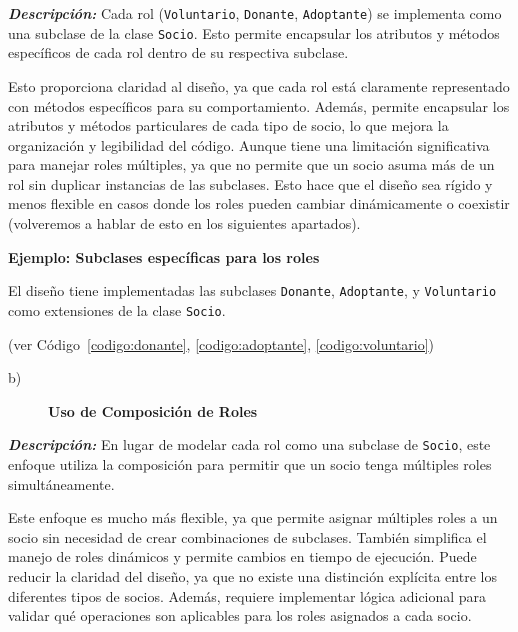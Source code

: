 \textit{\textbf{Descripción:}}  
Cada rol (\texttt{Voluntario}, \texttt{Donante}, \texttt{Adoptante}) se implementa como una 
subclase de la clase \texttt{Socio}. Esto permite encapsular los atributos y métodos 
específicos de cada rol dentro de su respectiva subclase.
\vspace{0.15cm}


Esto proporciona claridad al diseño, ya que cada rol está claramente representado con 
métodos específicos para su comportamiento. Además, permite encapsular los atributos y 
métodos particulares de cada tipo de socio, lo que mejora la organización y legibilidad 
del código. Aunque tiene una limitación significativa para manejar roles múltiples, ya que no permite que 
un socio asuma más de un rol sin duplicar instancias de las subclases. Esto hace que el 
diseño sea rígido y menos flexible en casos donde los roles pueden cambiar dinámicamente 
o coexistir (volveremos a hablar de esto en los siguientes apartados).\par
\vspace{0.15cm}



\textbf{Ejemplo: Subclases específicas para los roles}\par
El diseño tiene implementadas las subclases \texttt{Donante}, \texttt{Adoptante}, 
y \texttt{Voluntario} como extensiones de la clase \texttt{Socio}.\par
(ver Código~\ref{codigo:donante}, \ref{codigo:adoptante}, \ref{codigo:voluntario})

\begin{description}
    \item[b)] \textbf{Uso de Composición de Roles}
\end{description}

\textit{\textbf{Descripción:}}  
En lugar de modelar cada rol como una subclase de \texttt{Socio}, este enfoque utiliza 
la composición para permitir que un socio tenga múltiples roles simultáneamente. 
\vspace{0.15cm}


Este enfoque es mucho más flexible, ya que permite asignar múltiples roles a un socio 
sin necesidad de crear combinaciones de subclases. También simplifica el manejo de 
roles dinámicos y permite cambios en tiempo de ejecución.
Puede reducir la claridad del diseño, ya que no existe una distinción explícita entre 
los diferentes tipos de socios. Además, requiere implementar lógica adicional para 
validar qué operaciones son aplicables para los roles asignados a cada socio.\par
\vspace{0.15cm}


